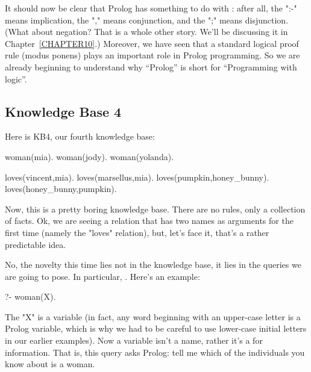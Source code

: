 It should now be clear that Prolog has something to do with
: after all, the ":-" means implication, the "," means
conjunction, and the ";" means disjunction.  (What about negation?
That is a whole other story. We'll be discussing it in
Chapter~\ref{CHAPTER10}.)  Moreover, we have seen that a standard
logical proof rule (modus ponens) plays an important role in Prolog
programming.  So we are already beginning to understand why ``Prolog''
is short for ``Programming with logic''.



\subsection*{Knowledge Base 4}\label{SUBSEC.L1.KB4}

Here is KB4, our fourth knowledge base:

\begin{LPNcodedisplay}
woman(mia).
woman(jody).
woman(yolanda).

loves(vincent,mia).
loves(marsellus,mia).
loves(pumpkin,honey_bunny).
loves(honey_bunny,pumpkin).
\end{LPNcodedisplay}


Now, this is a pretty boring knowledge base. There are no rules, only
a collection of facts. Ok, we are seeing a relation that has two names
as arguments for the first time (namely the "loves" relation), but,
let's face it, that's a rather predictable idea.

No, the novelty this time lies not in the knowledge base, it lies in
the queries we are going to pose. In particular, .  Here's an
example:
\begin{LPNcodedisplay}
?- woman(X).
\end{LPNcodedisplay}

The "X" is a variable (in fact, any word beginning with an upper-case
letter is a Prolog variable, which is why we had to be careful to use
lower-case initial letters in our earlier examples).  Now a variable
isn't a name, rather it's a  for
information. That is, this query asks Prolog: tell me which of the
individuals you know about is a woman.

